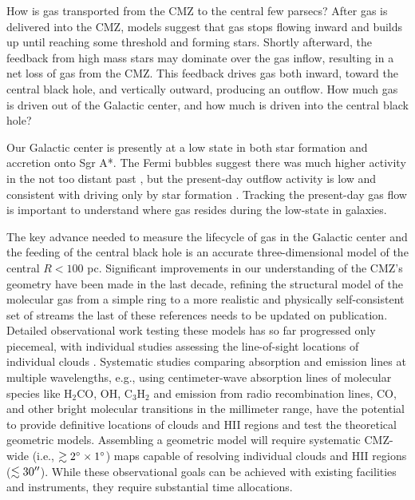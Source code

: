 \documentclass[modern]{aastex62}
\def\agnote#1{{\color{red}#1}}
\begin{document}
%

How is gas transported from the CMZ to the central few parsecs?
After gas is delivered into the CMZ, models suggest that gas stops flowing
inward and builds up until reaching some threshold and forming stars.  Shortly
afterward, the feedback from high mass stars may dominate over the gas inflow,
resulting in a net loss of gas from the CMZ.  This feedback drives gas both
inward, toward the central black hole, and vertically outward, producing an
outflow.  How much gas is driven out of the Galactic center, and how much
is driven into the central black hole?


Our Galactic center is presently at a low state in both star formation and
accretion onto Sgr A*.  The Fermi bubbles suggest there was much higher
activity in the not too distant past \citep{Su2010a}, but the present-day
outflow activity is low and consistent with driving only by star formation
\citep{Law2009a,Law2010a}.  Tracking the present-day gas flow is important
to understand where gas resides during the low-state in galaxies.

The key advance needed to measure the lifecycle of gas in the Galactic center
and the feeding of the central black hole is an accurate three-dimensional
model of the central $R<100$ pc.  Significant improvements in our understanding
of the CMZ's geometry have been made in the last decade, refining the structural
model of the molecular gas from a simple ring to a more realistic and physically
self-consistent set of streams
\citep{Molinari2011a,Kruijssen2015a,Ridley2017a,Sormani2018a,Kruijssen2018c}
\agnote{the last of these references needs to be updated on publication}.  Detailed
observational work testing these models has so far progressed only piecemeal,
with individual studies assessing the line-of-sight locations of individual clouds
\citep[e.g.][]{Butterfield2018a}.  Systematic studies comparing absorption and emission
lines at multiple wavelengths, e.g., using centimeter-wave absorption lines of molecular species
like H$_2$CO, OH, C$_3$H$_2$ and emission from radio recombination lines, CO,
and other bright molecular transitions in the millimeter range, have the
potential to provide definitive locations of clouds and HII regions and test
the theoretical geometric models.  Assembling a geometric model will require
systematic CMZ-wide (i.e., $\gtrsim2^{\circ}\times1^{\circ}$) maps capable of resolving
individual clouds and HII regions ($\lesssim30\mbox{$^{\prime\prime}$}$).  While these observational
goals can be achieved with existing facilities and instruments, they require substantial
time allocations.
\end{document}
